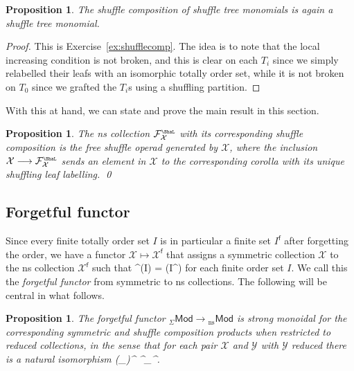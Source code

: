 \documentclass[fleqn, a4paper, twoside]{article}
\makeatletter
\newcommand{\Sha}{{\scaleobj{0.75}{\ShaL}}}
\newcommand{\0}{\langle 0\rangle}
\newcommand{\XX}{\mathcal{X}}
\newcommand{\YY}{\mathcal{Y}}
\newcommand{\FF}{\mathcal{F}}
\newcommand{\f}{\mathsf{f}}
\let\[\@undefined
\DeclareRobustCommand{\[}{\begin{equation}}%
\let\]\@undefined
\DeclareRobustCommand{\]}{\end{equation}}%
\theoremstyle{mytheorem}
\newtheorem{proposition}[theorem]{Proposition}
\theoremstyle{introthm}
\theoremstyle{mydefinition}
\theoremstyle{mydefinition2}
\theoremstyle{plain} %
\newcommand{\nsMod}{{}_{\mathrm{ns}}\mathsf{Mod}}
\newcommand{\SMod}{{}_\Sigma\mathsf{Mod}}
\newcommand{\?}{\,?\,}
\theoremstyle{mytheorem}
\theoremstyle{plain} %
\makeatother
\begin{document}
\begin{proposition}
The shuffle composition of shuffle tree
monomials is again a shuffle tree
monomial.
\end{proposition} 

\begin{proof}
This is Exercise~\ref{ex:shufflecomp}. The
idea is to note that the local increasing
condition is not broken, and this is clear
on each $T_i$ since we simply relabelled their
leafs with an isomorphic totally order
set, 
while it is not broken on
$T_0$ since we grafted the $T_i$s using
a shuffling partition.
\end{proof}

With this at hand, we can state and prove the
main result in this section. 

\begin{proposition}
The ns collection
$\FF_\XX^\Sha$ with its corresponding
shuffle composition is the \emph{free shuffle
operad} generated by $\XX$, where the
inclusion $\XX\longrightarrow \FF_\XX^\Sha$
sends an element in $\XX$ to the corresponding
corolla with its unique shuffling leaf
labelling. \qed
\end{proposition}

\subsection{Forgetful functor}

Since every finite totally order 
set $I$ is in particular a finite set
$I^{\f}$
after forgetting the order,
we have a functor
$\XX \longmapsto \XX^{\f}$ that assigns
a symmetric collection $\XX$ to the ns
collection $\XX^{\f}$ such that
\[ \XX^{\f}(I) = \XX(I^{\f}) \]
for each finite order set $I$. 
We call this the \emph{forgetful functor}
from symmetric to ns collections. 
The following will be central in what
follows.

\begin{proposition}
The forgetful functor $\SMod \longrightarrow 
\nsMod$ is strong monoidal for the corresponding 
symmetric and shuffle composition products
when restricted
to \emph{reduced} collections, in the sense
that for each pair $\XX$ and $\YY$ with
$\YY$ reduced there is a natural isomorphism
\[
(\XX\circ_\Sigma \YY)^{\f} \longrightarrow
 \XX^{\f}\circ_\Sha \YY^{\f}.
\]
\end{proposition}
\end{document}
